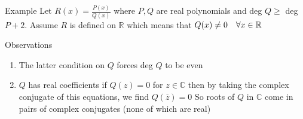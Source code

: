 \begin{parag}{Example}
    Let $R\left(x\right) = \frac{P\left(x\right)}{Q\left(x\right)}$ where $P, Q$ are real polynomials and deg $Q \geq$ deg $P + 2$. Assume $R$ is defined on $ \mathbb{R}$ which means that $Q\left(x\right) \neq 0 \mathspace \forall x \in \mathbb{R}$
	\begin{subparag}{Observations}
	    \begin{enumerate}
	        \item The latter condition on $Q$ forces deg $Q$ to be even
	        \item $Q$ has real coefficients if $Q\left(z\right) = 0$ for $z \in \mathbb{C}$ then by taking the complex conjugate of this equations, we find $Q\left(\overline{z}\right) = 0$ So roots of $Q$ in $\mathbb{C}$ come in pairs of complex conjugates (none of which are real)
	    \end{enumerate}
	    
	\end{subparag}
\end{parag}



	
	
	
	
	



